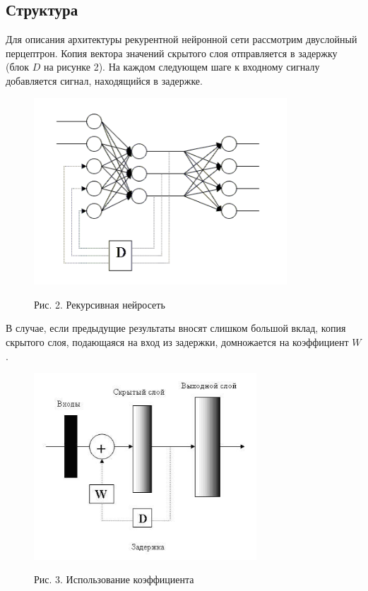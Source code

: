 \documentclass[14pt]{article}
\begin{document}
\subsection{Структура}
Для описания архитектуры рекурентной нейронной сети рассмотрим двуслойный перцептрон. Копия вектора значений скрытого слоя отправляется в задержку (блок $D$ на рисунке 2). На каждом следующем шаге к входному сигналу добавляется сигнал, находящийся в задержке.

\begin{figure}[!h]
    \centering
        \includegraphics[height=7cm]{Fig2.png}
    \parbox[t][1.2cm][c]{16cm}{
        \centering
        Рис. 2. Рекурсивная нейросеть
    }
\end{figure}


В случае, если предыдущие результаты вносят слишком большой вклад, копия скрытого слоя, подающаяся на вход из задержки, домножается на коэффициент $W$.


\begin{figure}[!h]
    \centering
        \includegraphics[height=7cm]{Fig4.jpg}
    \parbox[t][1.2cm][c]{16cm}{
        \centering
        Рис. 3. Использование коэффициента
    }
\end{figure}
\end{document}
